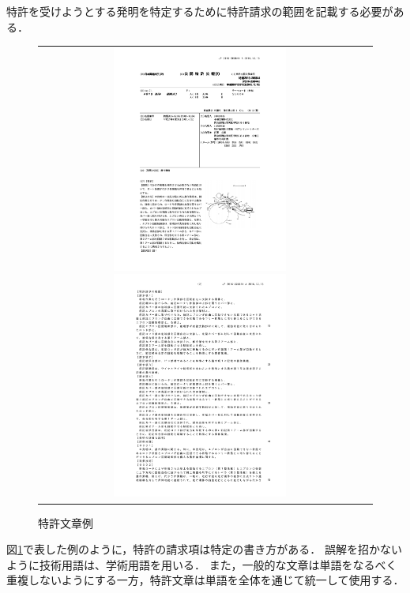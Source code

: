 \documentclass[master]{suribt}
\theoremstyle{definition}
\begin{document}
 特許を受けようとする発明を特定するために特許請求の範囲を記載する必要がある．
 \begin{figure}
  \hspace*{-2cm}
  \begin{tabular}{cc}
  \includegraphics[width=0.55\textwidth,natwidth=500,natheight=1100]{ex1-1.pdf}
  \includegraphics[width=0.55\textwidth,natwidth=500,natheight=1100]{ex1-2.pdf}
  \end{tabular}
  \caption{特許文章例}
  \label{fig:exp}
 \end{figure}

 図\ref{fig:exp}で表した例のように，特許の請求項は特定の書き方がある．
 誤解を招かないように技術用語は、学術用語を用いる．
 また，一般的な文章は単語をなるべく重複しないようにする一方，特許文章は単語を全体を通じて統一して使用する．
\end{document}
